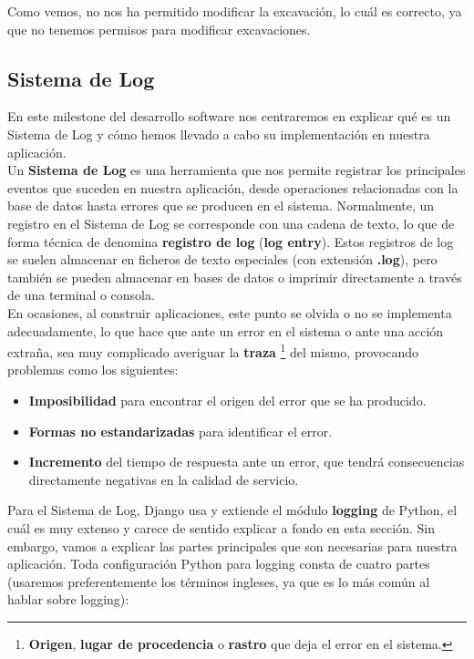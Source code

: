 Como vemos, no nos ha permitido modificar la excavación, lo cuál es correcto, ya que no
tenemos permisos para modificar excavaciones.

\subsection{Sistema de Log}
En este milestone del desarrollo software nos centraremos en explicar qué es un Sistema
de Log y cómo hemos llevado a cabo su implementación en nuestra aplicación. \\

Un \textbf{Sistema de Log} \cite{log-system} es una herramienta que nos permite registrar los principales
eventos que suceden en nuestra aplicación, desde operaciones relacionadas con la base de
datos hasta errores que se producen en el sistema. Normalmente, un registro en el Sistema
de Log se corresponde con una cadena de texto, lo que de forma técnica de denomina
\textbf{registro de log} (\textbf{log entry}). Estos registros de log se suelen
almacenar en ficheros de texto especiales (con extensión \textbf{.log}), pero también
se pueden almacenar en bases de datos o imprimir directamente a través de una terminal
o consola.\\

En ocasiones, al construir aplicaciones, este punto se olvida o no se implementa
adecuadamente, lo que hace que ante un error en el sistema o ante una acción extraña, sea
muy complicado averiguar la \textbf{traza} \footnote{\textbf{Origen},
\textbf{lugar de procedencia} o \textbf{rastro} que deja el error en el sistema.} del
mismo, provocando problemas como los siguientes:

    \begin{itemize}
        \item \textbf{Imposibilidad} para encontrar el origen del error que se ha
        producido.
        \item \textbf{Formas no estandarizadas} para identificar el error.
        \item \textbf{Incremento} del tiempo de respuesta ante un error, que tendrá
        consecuencias directamente negativas en la calidad de servicio.
    \end{itemize}

Para el Sistema de Log, Django usa y extiende el módulo \textbf{logging}
\cite{python-logging} de Python, el cuál es muy extenso y carece de sentido explicar a
fondo en esta sección. Sin embargo, vamos a explicar las partes principales que son
necesarias para nuestra aplicación. Toda configuración Python para logging consta de
cuatro partes (usaremos preferentemente los términos ingleses, ya que es lo más común al
hablar sobre logging):

